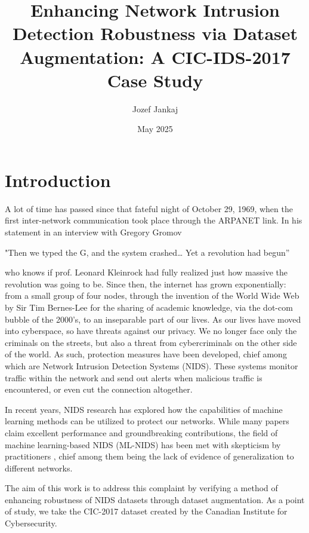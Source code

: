 \documentclass[english]{article}
\title{Enhancing Network Intrusion Detection Robustness via Dataset Augmentation: A CIC-IDS-2017 Case Study
}
\author{Jozef Jankaj}
\date{May 2025}
\begin{document}
	
\maketitle

\tableofcontents
	
	\newpage
	
	\section{Introduction}
	A lot of time has passed since that fateful night of October 29, 1969, when the first inter-network communication took place through the ARPANET link. In his statement in an interview with Gregory Gromov
	
	\begin{center} 
		"Then we typed the G, and the system crashed… Yet a revolution had begun” \cite{kleinrock}
	\end{center}
	
	who knows if prof. Leonard Kleinrock had fully realized just how massive the revolution was going to be. 
	Since then, the internet has grown exponentially: from a small group of four nodes, through the invention of the World Wide Web by Sir Tim Bernes-Lee for the sharing of academic knowledge, via the dot-com bubble of the 2000's, to an inseparable part of our lives. As our lives have moved into cyberspace, so have threats against our privacy. We no longer face only the criminals on the streets, but also a threat from cybercriminals on the other side of the world. As such, protection measures have been developed, chief among which are Network Intrusion Detection Systems (NIDS). These systems monitor traffic within the network and send out alerts when malicious traffic is encountered, or even cut the connection altogether. 
	
	In recent years, NIDS research has explored how the capabilities of machine learning methods can be utilized to protect our networks. While many papers claim excellent performance and groundbreaking contributions, the field of machine learning-based NIDS (ML-NIDS) has been met with skepticism by practitioners \cite{sok_nids_assessment}, chief among them being the lack of evidence of generalization to different networks.
	
	The aim of this work is to address this complaint by verifying a method of enhancing robustness of NIDS datasets through dataset augmentation. As a point of study, we take the CIC-2017 dataset \cite{cic_2017} created by the Canadian Institute for Cybersecurity. 
	
\end{document}

